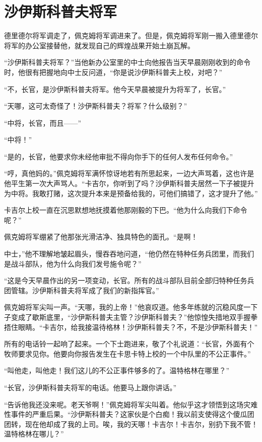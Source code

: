 \chapter{沙伊斯科普夫将军}
 
    德里德尔将军调走了，佩克姆将军调进来了。但是，佩克姆将军刚一搬入德里德尔将军的办公室接替他，就发现自己的辉煌战果开始土崩瓦解。

    “沙伊斯科普夫将军？”当他新办公室里的中士向他报告当天早晨刚刚收到的命令时，他很有把握地向中士反问道，“你是说沙伊斯科普夫上校，对吧？”

    “不，长官，是沙伊斯科普夫将军。他今天早晨被提升为将军了，长官。”

    “天哪，这可太奇怪了！沙伊斯科普夫？将军？什么级别？”

    “中将，长官，而且——”

    “中将！”

    “是的，长官，他要求你未经他审批不得向你手下的任何人发布任何命令。”

    “哼，真他妈的。”佩克姆将军满怀惊讶地若有所思起来，一边大声骂着，这也许是他平生第一次大声骂人。“卡吉尔，你听到了吗？沙伊斯科普夫居然一下子被提升为中将。我敢打赌，这次提升本来是预备给我的，可他们搞错了，这才提升了他。”

    卡吉尔上校一直在沉思默想地抚摸着他那刚毅的下巴。“他为什么向我们下命令呢？”

    佩克姆将军绷紧了他那张光滑洁净、独具特色的面孔。“是啊！

    中士，”他不理解地皱起眉头，慢吞吞地问道，“他仍然在特种任务兵团里，而我们是战斗部队，他为什么向我们发号施令呢？”

    “这是今天早晨作出的另一项变动，长官。所有的战斗部队目前全部归特种任务兵团管辖。沙伊斯科普夫将军成了我们的新指挥官。”

 


    佩克姆将军尖叫一声。“天哪，我的上帝！”他哀叹道。他多年练就的沉稳风度一下子变成了歇斯底里，“沙伊斯科普夫主管？沙伊斯科普夫？”他惊惶失措地双手握拳捂住眼睛。“卡吉尔，给我接温待格林！沙伊斯科普夫？不，不是沙伊斯科普夫！”

    所有的电话铃一起响了起来。一个下士跑进来，敬了个礼说道：“长官，外面有个牧师要求见你。他要向你报告发生在卡思卡特上校的一个中队里的不公正事件。”

    “叫他走，叫他走！我们这儿的不公正事件够多的了。温特格林在哪里？”

    “长官，沙伊斯科普夫将军的电话。他要马上跟你讲话。”

    “告诉他我还没来呢。老天爷啊！”佩克姆将军尖叫着。他似乎这才领悟到这场灾难性事件的严重后果。“沙伊斯科普夫？这家伙是个白痴！我以前支使得这个傻瓜团团转，现在他却成了我的上司。唉，我的天哪！卡吉尔！卡吉尔，别扔下我不管！温特格林在哪儿？”

